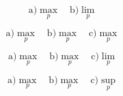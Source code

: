 \documentclass{article}
\begin{document}
\[ \text{a)}\max_{p}\quad\text{b)}\lim_{p} \]

\[ \text{a)}\max_{p}\quad\text{b)}\max_{p}\quad\text{c)}\max_{p} \]

\[ \text{a)}\max_{p}\quad\text{b)}\max_{p}\quad\text{c)}\lim_{p} \]

\[ \text{a)}\max_{p}\quad\text{b)}\max_{p}\quad\text{c)}\sup_{p} \]

\end{document}
